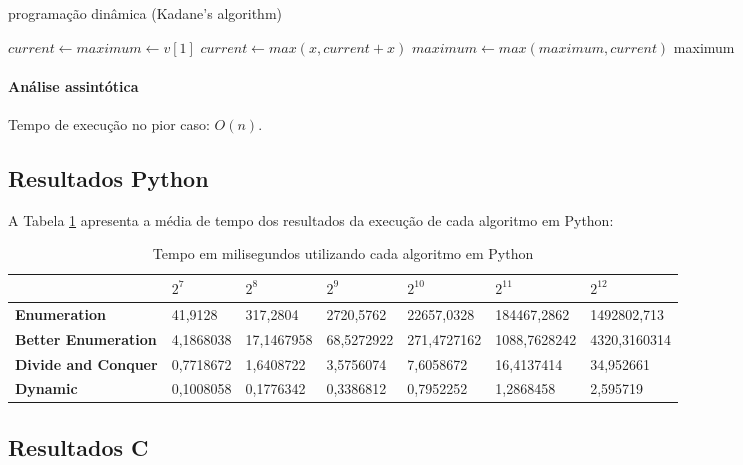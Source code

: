 \documentclass[
	12pt,				%
	oneside,   	        %
	a4paper,			%
	english,			%
	french,				%
	spanish,			%
	brazil,				%
	]{pacotes/abntex2}
\begin{document}
\begin{algorithm}
\caption{programação dinâmica (Kadane's algorithm)}
\label{algo:preencheprimeiroarranjo}
\begin{algorithmic}[1]
        \State $current \gets maximum \gets v[1]$
            \State $current \gets max(x, current + x)$
            \State $maximum \gets max(maximum, current)$
        \EndFor
        \State \Return maximum
    \EndFunction
\end{algorithmic}
\end{algorithm}

\paragraph{Análise assintótica} Tempo de execução no pior caso: $O(n)$.

\FloatBarrier
\subsection{Resultados Python}


A Tabela \ref{tab:python} apresenta a média de tempo dos resultados da execução de cada algoritmo em Python:

\begin{table}[!htb]
\centering
\caption{Tempo em milisegundos utilizando cada algoritmo em Python}
\label{tab:python}
\footnotesize   %
\begin{tabular}{l|llllll}
\toprule
\textbf{} & $2^7$ & $2^8$ & $2^9$ & $2^{10}$ & $2^{11}$ & $2^{12}$\\
\midrule
\textbf{Enumeration} & 41,9128 & 317,2804 & 2720,5762 & 22657,0328 & 184467,2862 & 1492802,713\\
\textbf{Better Enumeration} & 4,1868038 & 17,1467958 & 68,5272922 & 271,4727162 & 1088,7628242 & 4320,3160314\\
\textbf{Divide and Conquer} & 0,7718672 & 1,6408722 & 3,5756074 & 7,6058672 & 16,4137414 & 34,952661\\
\textbf{Dynamic} & 0,1008058 & 0,1776342 & 0,3386812 & 0,7952252 & 1,2868458 & 2,595719\\
\bottomrule
\end{tabular}
\end{table}

\subsection{Resultados C}
\end{document}
